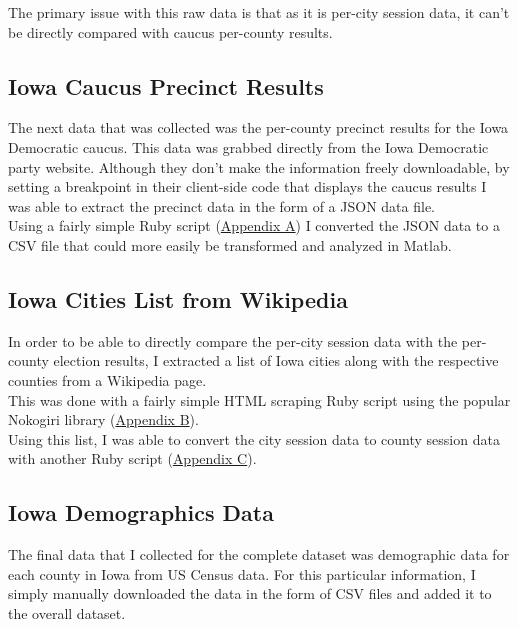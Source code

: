 \documentclass[11pt]{article}
\begin{document}
\begin{multicols}{2}

The primary issue with this raw data is that as it is per-city session data, it can't be directly compared with caucus per-county results.

\subsection{Iowa Caucus Precinct Results}

The next data that was collected was the per-county precinct results for the Iowa Democratic caucus. This data was grabbed directly from the Iowa Democratic party website. Although they don't make the information freely downloadable, by setting a breakpoint in their client-side code that displays the caucus results I was able to extract the precinct data in the form of a JSON data file. \\

Using a fairly simple Ruby script (\underline{Appendix A}) I converted the JSON data to a CSV file that could more easily be transformed and analyzed in Matlab.

\subsection{Iowa Cities List from Wikipedia}

In order to be able to directly compare the per-city session data with the per-county election results, I extracted a list of Iowa cities along with the respective counties from a Wikipedia page. \\

This was done with a fairly simple HTML scraping Ruby script using the popular Nokogiri library (\underline{Appendix B}). \\

Using this list, I was able to convert the city session data to county session data with another Ruby script (\underline{Appendix C}).

\subsection{Iowa Demographics Data}

The final data that I collected for the complete dataset was demographic data for each county in Iowa from US Census data. For this particular information, I simply manually downloaded the data in the form of CSV files and added it to the overall dataset. \\


\end{multicols}
\end{document}
